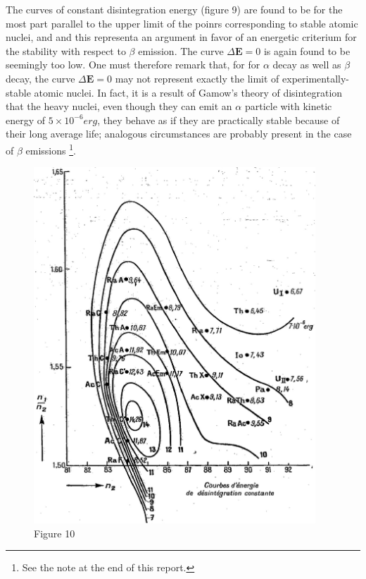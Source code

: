 \documentclass{article}
\newcommand{\var}[1]{\pmb{#1}}
\newcommand{\unit}[1]{#1}
\newcommand{\ee}[2]{{{#1}\times 10^{#2}}}
\newcommand{\E}{\var{E}}
\begin{document}
The curves of constant disintegration energy (figure 9) are found to be for the most part parallel to the upper limit of the poinrs corresponding to stable atomic nuclei, and and this representa an argument in favor of an energetic criterium for the stability with respect to $\beta$ emission. The curve $\Delta\E = 0$ is again found to be seemingly too low. One must therefore remark that, for for $\alpha$ decay as well as $\beta$ decay, the curve $\Delta\E = 0$ may not represent exactly the limit of experimentally-stable atomic nuclei. In fact, it is a result of Gamow's theory of disintegration that the heavy nuclei, even though they can emit an $\alpha$ particle with kinetic energy of $\ee{5}{-6}\unit{erg}$, they behave as if they are practically stable because of their long average life; analogous circumstances are probably present in the case of $\beta$ emissions \footnote{See the note at the end of this report.}.

\begin{figure}[h!]
\centering
\includegraphics[width=300pt]{images/fig10}
{\caption*{Figure 10}}
\end{figure}
\end{document}
